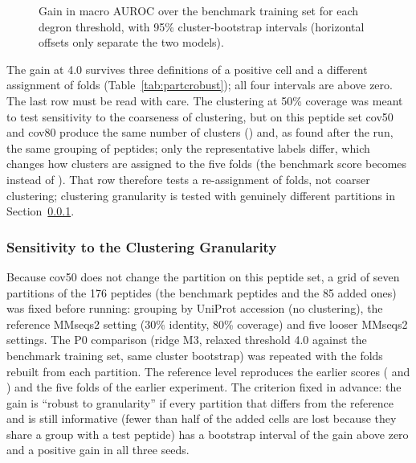 \begin{figure}[htbp]
  \centering
  
  \caption{Gain in macro AUROC over the benchmark training set for each degron threshold, with 95\% cluster-bootstrap
  intervals (horizontal offsets only separate the two models).}\label{fig:threshold}
\end{figure}

The gain at 4.0 survives three definitions of a positive cell and a different assignment of folds
(Table~\ref{tab:partcrobust}); all four intervals are above zero. The last row must be read with care. The clustering at
50\% coverage was meant to test sensitivity to the coarseness of clustering, but on this peptide set cov50 and
cov80 produce the same number of clusters (\nCClusters{}) and, as found after the run, the same grouping of peptides; only the
representative labels differ, which changes how clusters are assigned to the five folds (the benchmark score becomes \nCCoverFiftyBase{}
instead of \nAucRidge). That row therefore tests a re-assignment of folds, not coarser clustering; clustering granularity is tested
with genuinely different partitions in Section~\ref{sec:res-recluster}.

\begin{table}[htbp]
  \centering
  \caption{Robustness of the gain at threshold 4.0 (ridge M3)}\label{tab:partcrobust}
  
\end{table}

\subsubsection{Sensitivity to the Clustering Granularity}\label{sec:res-recluster}
Because cov50 does not change the partition on this peptide set, a grid of seven partitions of the 176 peptides
(the \nNPep{} benchmark peptides and the 85 added ones) was fixed before running: grouping by UniProt accession
(no clustering), the reference MMseqs2 setting (30\% identity, 80\% coverage) and five looser MMseqs2 settings. The P0
comparison (ridge M3, relaxed threshold 4.0 against the benchmark training set, same cluster bootstrap) was repeated with the
folds rebuilt from each partition. The reference level reproduces the earlier scores (\nAucRidge{} and \nAucRidgeExt) and the five
folds of the earlier experiment. The criterion fixed in advance: the gain is ``robust to granularity'' if every
partition that differs from the reference and is still informative (fewer than half of the added cells are lost because they
share a group with a test peptide) has a bootstrap interval of the gain above zero and a positive gain in all three seeds.

